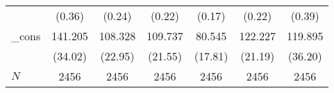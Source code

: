 {\begin{tabular}{l*{6}{c}}
            &                   (0.36)         &                   (0.24)         &                   (0.22)         &                   (0.17)         &                   (0.22)         &                   (0.39)         \\
\_cons      &                  141.205\sym{***}&                  108.328\sym{***}&                  109.737\sym{***}&                   80.545\sym{***}&                  122.227\sym{***}&                  119.895\sym{***}\\
            &                  (34.02)         &                  (22.95)         &                  (21.55)         &                  (17.81)         &                  (21.19)         &                  (36.20)         \\
\hline
\(N\)       &                     2456         &                     2456         &                     2456         &                     2456         &                     2456         &                     2456         \\
\hline\hline
\end{tabular}
}
